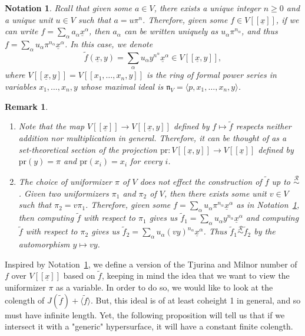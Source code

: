 \documentclass{article}
\newtheorem{notation}[theorem]{Notation}
\newtheorem{remark}[theorem]{Remark}
\newcommand{\equivr}{\overset{\mathcal{R}}{\sim}}
\newcommand{\naxV}{\mathfrak{n}_V}
\newcommand{\Vx}{V[[\underline{x}]]}
\newcommand{\Vxy}{V[[\underline{x},y]]}
\numberwithin{theorem}{section}
\begin{document}
\begin{notation}\label{def:subsoil}
Rcall that given some $a \in V$, there exists a unique integer $n \geq 0$ and a unique unit $u \in V$ such that $a=u\pi^n$. Therefore, given some $f \in V[[\underline{x}]]$, if we can write $f=\sum_{\alpha}a_{\alpha} \underline{x}^{\alpha}$, then $a_{\alpha}$ can be written uniquely as $u_{\alpha} \pi^{n_{\alpha}}$, and thus $f=\sum_{\alpha} u_{\alpha} \pi^{n_{\alpha}} \underline{x}^{\alpha}$. In this case, we denote 
%
 \begin{equation*}
     \tilde{f}(\underline{x},y)=\sum_{\alpha} u_{\alpha} y^{n^{\alpha}} \underline{x}^{\alpha} \in V[[\underline{x},y]],
 \end{equation*}
  where $V[[\underline{x},y]]=V[[x_1, \dots, x_n, y]]$ is the ring of formal power series in variables $x_1, \dots, x_n,y$ whose maximal ideal is $\naxV=\langle p, x_1, \dots, x_n, y \rangle$.
\end{notation}

\begin{remark}\label{rem:y-p}
\begin{enumerate}
    \item \textup{Note that the map $\Vx \to \Vxy$ defined by $f \mapsto \tilde{f}$ respects neither addition nor multiplication in general. Therefore, it can be thought of as a set-theoretical section of the projection $\text{pr} \colon \Vxy \to \Vx$ defined by $\text{pr}\left(y\right)=\pi$ and $\text{pr}\left(x_i\right)=x_i$ for every $i$. }
    \item \textup{The choice of uniformizer $\pi$ of $V$ does not effect the construction of $\tilde{f}$ up to $\equivr$. Given two uniformizers $\pi_1$ and $\pi_2$ of $V$, then there exists some unit $v \in V$ such that $\pi_2 = v \pi_1$. Therefore, given some $f=\sum_{\alpha} u_{\alpha} \pi^{n_{\alpha}} \underline{x}^{\alpha}$ as in Notation~\ref{def:subsoil}, then computing $\tilde{f}$ with respect to $\pi_1$ gives us $\tilde{f}_1=\sum_{\alpha} u_{\alpha} y^{n_{\alpha}} \underline{x}^{\alpha}$ and computing $\tilde{f}$ with respect to $\pi_2$ gives us $\tilde{f}_2=\sum_{\alpha} u_{\alpha} (vy)^{n_{\alpha}} \underline{x}^{\alpha}$.  Thus $\tilde{f}_1 \equivr \tilde{f}_2$ by the automorphism $y \mapsto vy$.  }
\end{enumerate}

\end{remark}


Inspired by Notation~\ref{def:subsoil}, we define a version of the Tjurina and Milnor number of $f$ over $\Vx$ based on $\tilde{f}$, keeping in mind the idea that we want to view the uniformizer $\pi$ as a variable. In order to do so, we would like to look at the colength of $J(\tilde{f})+\langle \tilde{f}\rangle$. But, this ideal is of at least coheight 1 in general, and so must have infinite length. Yet, the following proposition will tell us that if we intersect it with a "generic" hypersurface, it will have a constant finite colength. \\
\end{document}
